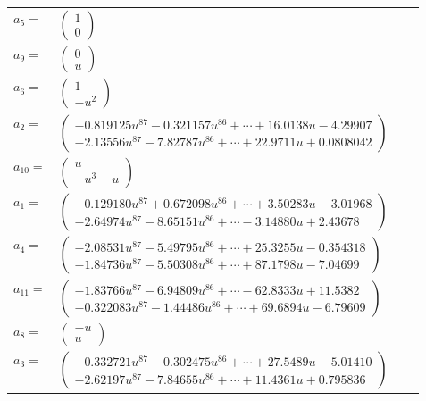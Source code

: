 \documentclass[1p]{elsarticle_modified}
\theoremstyle{definition}
\begin{document}
\begin{tabular}{m{7pt} m{180pt} m{7pt} m{180pt} }
\flushright $a_{5}=$&$\begin{pmatrix}1\\0\end{pmatrix}$ \\
\flushright $a_{9}=$&$\begin{pmatrix}0\\u\end{pmatrix}$ \\
\flushright $a_{6}=$&$\begin{pmatrix}1\\- u^2\end{pmatrix}$ \\
\flushright $a_{2}=$&$\begin{pmatrix}-0.819125 u^{87}-0.321157 u^{86}+\cdots+16.0138 u-4.29907\\-2.13556 u^{87}-7.82787 u^{86}+\cdots+22.9711 u+0.0808042\end{pmatrix}$ \\
\flushright $a_{10}=$&$\begin{pmatrix}u\\- u^3+u\end{pmatrix}$ \\
\flushright $a_{1}=$&$\begin{pmatrix}-0.129180 u^{87}+0.672098 u^{86}+\cdots+3.50283 u-3.01968\\-2.64974 u^{87}-8.65151 u^{86}+\cdots-3.14880 u+2.43678\end{pmatrix}$ \\
\flushright $a_{4}=$&$\begin{pmatrix}-2.08531 u^{87}-5.49795 u^{86}+\cdots+25.3255 u-0.354318\\-1.84736 u^{87}-5.50308 u^{86}+\cdots+87.1798 u-7.04699\end{pmatrix}$ \\
\flushright $a_{11}=$&$\begin{pmatrix}-1.83766 u^{87}-6.94809 u^{86}+\cdots-62.8333 u+11.5382\\-0.322083 u^{87}-1.44486 u^{86}+\cdots+69.6894 u-6.79609\end{pmatrix}$ \\
\flushright $a_{8}=$&$\begin{pmatrix}- u\\u\end{pmatrix}$ \\
\flushright $a_{3}=$&$\begin{pmatrix}-0.332721 u^{87}-0.302475 u^{86}+\cdots+27.5489 u-5.01410\\-2.62197 u^{87}-7.84655 u^{86}+\cdots+11.4361 u+0.795836\end{pmatrix}$ \\

\end{tabular}
\end{document}
